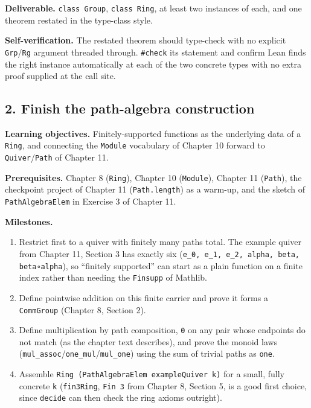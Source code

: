 \textbf{Deliverable.} \texttt{class Group}, \texttt{class Ring}, at least two instances of each, and one theorem restated in the type-class style.

\textbf{Self-verification.} The restated theorem should type-check with no explicit \texttt{Grp}/\texttt{Rg} argument threaded through. \texttt{\#check} its statement and confirm Lean finds the right instance automatically at each of the two concrete types with no extra proof supplied at the call site.

\subsection{2. Finish the path-algebra construction}\label{sec:13-next-steps:03-next-projects:3}

\textbf{Learning objectives.} Finitely-supported functions as the underlying data of a \texttt{Ring}, and connecting the \texttt{Module} vocabulary of Chapter 10 forward to \texttt{Quiver}/\texttt{Path} of Chapter 11.

\textbf{Prerequisites.} Chapter 8 (\texttt{Ring}), Chapter 10 (\texttt{Module}), Chapter 11 (\texttt{Path}), the checkpoint project of Chapter 11 (\texttt{Path.length}) as a warm-up, and the sketch of \texttt{PathAlgebraElem} in Exercise 3 of Chapter 11.

\textbf{Milestones.}

\begin{enumerate}
\def\labelenumi{\arabic{enumi}.}
\tightlist
\item
  Restrict first to a quiver with finitely many paths total. The example quiver from Chapter 11, Section 3 has exactly six (\texttt{e\_\allowbreak{}0, e\_\allowbreak{}1, e\_\allowbreak{}2, alpha, beta, beta∘alpha}), so ``finitely supported'' can start as a plain function on a finite index rather than needing the \texttt{Finsupp} of Mathlib.
\item
  Define pointwise addition on this finite carrier and prove it forms a \texttt{CommGroup} (Chapter 8, Section 2).
\item
  Define multiplication by path composition, \texttt{0} on any pair whose endpoints do not match (as the chapter text describes), and prove the monoid laws (\texttt{mul\_\allowbreak{}assoc}/\texttt{one\_\allowbreak{}mul}/\texttt{mul\_\allowbreak{}one}) using the sum of trivial paths as \texttt{one}.
\item
  Assemble \texttt{Ring (PathAlgebraElem exampleQuiver k)} for a small, fully concrete \texttt{k} (\texttt{fin3Ring}, \texttt{Fin 3} from Chapter 8, Section 5, is a good first choice, since \texttt{decide} can then check the ring axioms outright).
\end{enumerate}

